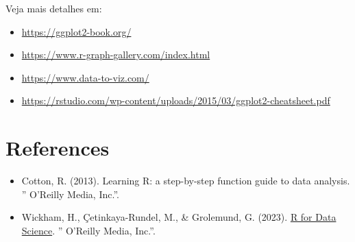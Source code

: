 \documentclass[
]{book}
\providecommand{\tightlist}{%
  \setlength{\itemsep}{0pt}\setlength{\parskip}{0pt}}
\begin{document}
Veja mais detalhes em:

\begin{itemize}
\tightlist
\item
  \url{https://ggplot2-book.org/}
\item
  \url{https://www.r-graph-gallery.com/index.html}
\item
  \url{https://www.data-to-viz.com/}
\item
  \url{https://rstudio.com/wp-content/uploads/2015/03/ggplot2-cheatsheet.pdf}
\end{itemize}

\chapter*{References}\label{references}

\begin{itemize}
\item
  Cotton, R. (2013). Learning R: a step-by-step function guide to data analysis. '' O'Reilly Media, Inc.''.
\item
  Wickham, H., Çetinkaya-Rundel, M., \& Grolemund, G. (2023). \href{https://r4ds.had.co.nz/}{R for Data Science}. '' O'Reilly Media, Inc.''.
\end{itemize}

  
\end{document}
